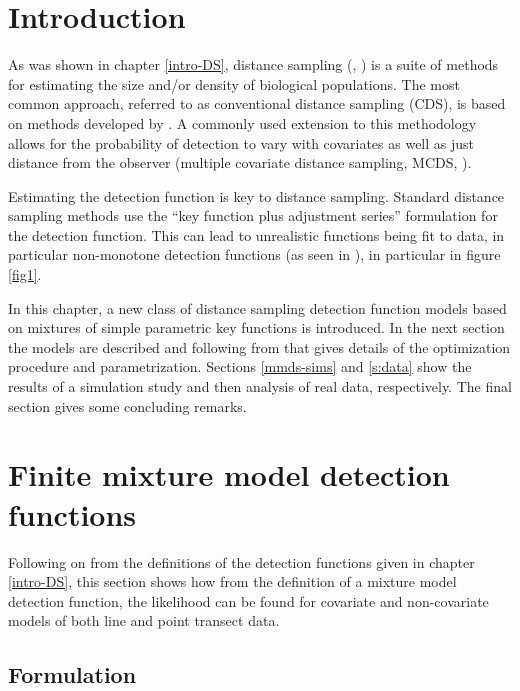 \label{chap-mmds}

\section{Introduction}
\label{s:intro}

 As was shown in chapter \ref{intro-DS}, distance sampling (\cite{IDS}, \cite{ADS}) is a suite of methods for estimating the size and/or density of biological populations. The most common approach, referred to as conventional distance sampling (CDS), is based on methods developed by . A commonly used extension to this methodology allows for the probability of detection to vary with covariates as well as just distance from the observer (multiple covariate distance sampling, MCDS, \cite[chapter 3]{ADS}).

Estimating the detection function is key to distance sampling. Standard distance sampling methods use the ``key function plus adjustment series'' formulation for the detection function. This can lead to unrealistic functions being fit to data, in particular non-monotone detection functions (as seen in ), in particular in figure \ref{fig1}.

In this chapter, a new class of distance sampling detection function models based on mixtures of simple parametric key functions is introduced. In the next section the models are described and following from that  gives details of the optimization procedure and parametrization. Sections \ref{mmds-sims} and \ref{s:data} show the results of a simulation study and then analysis of real data, respectively. The final section gives some concluding remarks.

\section{Finite mixture model detection functions}

Following on from the definitions of the detection functions given in chapter \ref{intro-DS}, this section shows how from the definition of a mixture model detection function, the likelihood can be found for covariate and non-covariate models of both line and point transect data.

\subsection{Formulation}
\label{s:detfcts}


